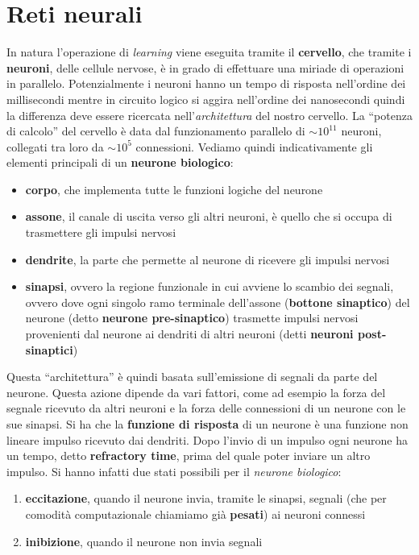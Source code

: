 \chapter{Reti neurali}

In natura l'operazione di \textit{learning} viene eseguita tramite il
\textbf{cervello}, che tramite i \textbf{neuroni}, delle cellule nervose, è in
grado di effettuare una miriade di operazioni in parallelo. Potenzialmente i
neuroni hanno un tempo di risposta nell'ordine dei millisecondi mentre in
circuito logico si aggira nell'ordine dei nanosecondi quindi la differenza deve
essere ricercata nell'\textit{architettura} del nostro cervello. La ``potenza di
calcolo'' del cervello è data dal funzionamento parallelo di $\sim 10^{11}$
neuroni, collegati tra loro da $\sim 10^5$ connessioni. Vediamo quindi
indicativamente gli elementi principali di un \textbf{neurone biologico}:
\begin{itemize}
	\item \textbf{corpo}, che implementa tutte le funzioni logiche del neurone
	\item \textbf{assone}, il canale di uscita verso gli altri neuroni, è quello
	      che si occupa di trasmettere gli impulsi nervosi
	\item \textbf{dendrite}, la parte che permette al neurone di ricevere gli
	      impulsi nervosi
	\item \textbf{sinapsi}, ovvero la regione funzionale in cui avviene lo scambio
	      dei segnali, ovvero dove ogni singolo ramo terminale dell'assone
	      (\textbf{bottone sinaptico}) del neurone (detto \textbf{neurone
	      pre-sinaptico}) trasmette impulsi nervosi provenienti dal neurone ai
	      dendriti di altri neuroni (detti \textbf{neuroni post-sinaptici})
\end{itemize}
Questa ``architettura'' è quindi basata sull'emissione di segnali da parte del
neurone. Questa azione dipende da vari fattori, come ad esempio la forza del
segnale ricevuto da altri neuroni e la forza delle connessioni di un neurone con
le sue sinapsi. Si ha che la \textbf{funzione di risposta} di un neurone è una
funzione non lineare impulso ricevuto dai dendriti. Dopo l'invio di un impulso
ogni neurone ha un tempo, detto \textbf{refractory time}, prima del quale poter
inviare un altro impulso. Si hanno infatti due stati possibili per il
\textit{neurone biologico}:
\begin{enumerate}
	\item \textbf{eccitazione}, quando il neurone invia, tramite le sinapsi,
	      segnali (che per comodità computazionale chiamiamo già \textbf{pesati}) ai
	      neuroni connessi
	\item \textbf{inibizione}, quando il neurone non invia segnali
\end{enumerate}
